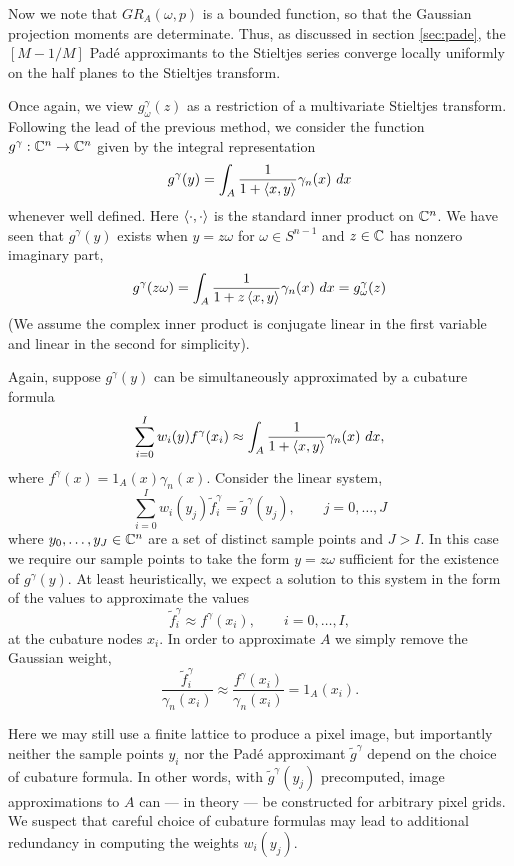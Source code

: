 Now we note that $GR_A(\omega, p)$ is a bounded function, so that the Gaussian projection moments are determinate. Thus, as discussed in section \ref{sec:pade}, the $[M-1/M]$ Pad\'e approximants to the Stieltjes series converge locally uniformly on the half planes to the Stieltjes transform.

Once again, we view $g^\gamma_\omega(z)$ as a restriction of a multivariate Stieltjes transform. Following the lead of the previous method, we consider the function $g^\gamma : \mathbb{C}^n \to \mathbb{C}^n$ given by the integral representation
\[
  g^\gamma(y) = \int_{A} \frac{1}{1 + \left\langle x, y \right\rangle} \gamma_n(x) ~dx
\] 
whenever well defined. Here $\left\langle \cdot, \cdot \right\rangle$ is the standard inner product on $\mathbb{C}^n$. We have seen that $g^\gamma(y)$ exists when $y = z\omega$ for $\omega \in S^{n-1}$ and $z \in \mathbb{C}$ has nonzero imaginary part,
\[
  g^\gamma(z\omega) 
  = \int_{A} \frac{1}{1 + z\left\langle x, y \right\rangle} \gamma_n(x) ~dx
  = g^\gamma_\omega(z)
\]
(We assume the complex inner product is conjugate linear in the first variable and linear in the second for simplicity). 

Again, suppose $g^\gamma(y)$ can be simultaneously approximated by a cubature formula
\[
  \sum_{i = 0}^I w_i(y) f^\gamma(x_i) \approx \int_{A} \frac1{1 + \left\langle x, y \right\rangle} \gamma_n(x) ~dx,
\]
where $f^\gamma(x) = 1_A(x)\gamma_n(x)$. Consider the linear system,
\[
  \sum_{i = 0}^I w_i(y_j) \tilde {f}^\gamma_i = \tilde g^\gamma(y_j), \qquad j = 0, \ldots, J
\]
where $y_0, \ldots, y_J \in \mathbb{C}^n$ are a set of distinct sample points and $J > I$. In this case we require our sample points to take the form $y = z\omega$ sufficient for the existence of $g^\gamma(y)$. At least heuristically, we expect a solution to this system in the form of the values to approximate the values
\[
  \tilde f^\gamma_i \approx f^\gamma(x_i), \qquad i = 0, \ldots, I,
\]
at the cubature nodes $x_i$. In order to approximate $A$ we simply remove the Gaussian weight,
\[
  \frac{\tilde f^\gamma_i}{\gamma_n(x_i)} 
  \approx \frac{f^\gamma(x_i)}{\gamma_n(x_i)}
  = 1_A(x_i).
\]

Here we may still use a finite lattice to produce a pixel image, but importantly neither the sample points $y_i$ nor the Pad\'e approximant $\tilde g^\gamma$ depend on the choice of cubature formula. In other words, with $\tilde g^\gamma(y_j)$ precomputed, image approximations to $A$ can — in theory — be constructed for arbitrary pixel grids. We suspect that careful choice of cubature formulas may lead to additional redundancy in computing the weights $w_i(y_j)$.

